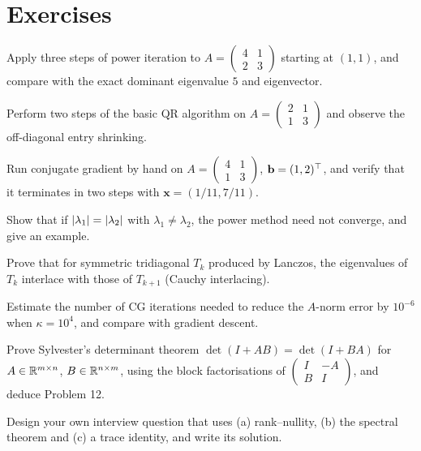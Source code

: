\section{Exercises}

\begin{exercise}
Apply three steps of power iteration to $A=\begin{pmatrix}4&1\\2&3\end{pmatrix}$ starting at $(1,1)$, and compare with the exact dominant eigenvalue $5$ and eigenvector.
\end{exercise}

\begin{exercise}
Perform two steps of the basic QR algorithm on $A=\begin{pmatrix}2&1\\1&3\end{pmatrix}$ and observe the off-diagonal entry shrinking.
\end{exercise}

\begin{exercise}
Run conjugate gradient by hand on $A=\begin{pmatrix}4&1\\1&3\end{pmatrix}$, $\mathbf{b}=(1,2)^{\top}$, and verify that it terminates in two steps with $\mathbf{x}=(1/11,7/11)$.
\end{exercise}

\begin{exercise}
Show that if $\lvert\lambda_1\rvert=\lvert\lambda_2\rvert$ with $\lambda_1\ne\lambda_2$, the power method need not converge, and give an example.
\end{exercise}

\begin{exercise}
Prove that for symmetric tridiagonal $T_k$ produced by Lanczos, the eigenvalues of $T_k$ interlace with those of $T_{k+1}$ (Cauchy interlacing).
\end{exercise}

\begin{exercise}
Estimate the number of CG iterations needed to reduce the $A$-norm error by $10^{-6}$ when $\kappa=10^4$, and compare with gradient descent.
\end{exercise}

\begin{exercise}
Prove Sylvester's determinant theorem $\det(I+AB)=\det(I+BA)$ for $A\in\mathbb{R}^{m\times n}$, $B\in\mathbb{R}^{n\times m}$, using the block factorisations of $\begin{pmatrix}I&-A\\B&I\end{pmatrix}$, and deduce Problem 12.
\end{exercise}

\begin{exercise}
Design your own interview question that uses (a) rank--nullity, (b) the spectral theorem and (c) a trace identity, and write its solution.
\end{exercise}
